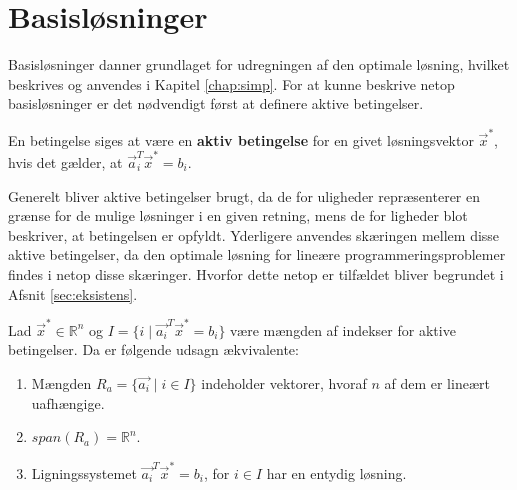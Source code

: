 \section{Basisløsninger}


Basisløsninger danner grundlaget for udregningen af den optimale løsning, hvilket beskrives og anvendes i Kapitel \ref{chap:simp}. For at kunne beskrive netop basisløsninger er det nødvendigt først at definere aktive betingelser.%

\begin{defn}
En betingelse siges at være en \textbf{aktiv betingelse} for en givet løsningsvektor $\vec{x}^*$, hvis det gælder, at $\vec{a}_i^T \vec{x}^* = b_i$.
\label{def:aktiv}
\end{defn}

Generelt bliver aktive betingelser brugt, da de for uligheder repræsenterer en grænse for de mulige løsninger i en given retning, mens de for ligheder blot beskriver, at betingelsen er opfyldt.
Yderligere anvendes skæringen mellem disse aktive betingelser, da den optimale løsning for lineære programmeringsproblemer findes i netop disse skæringer. Hvorfor dette netop er tilfældet bliver begrundet i Afsnit \ref{sec:eksistens}.

\begin{stn}
Lad $\vec{x}^* \in \mathds{R}^n$ og $I = \{i \mid \vec{a_i}^T \vec{x}^* = b_i\}$ være mængden af indekser for aktive betingelser. Da er følgende udsagn ækvivalente:
\begin{enumerate}[label=(\alph*)]
\item Mængden $R_a =\{\vec{a_i} \mid i\in I\}$ indeholder vektorer, hvoraf $n$ af dem er lineært uafhængige.
\item $span(R_a) = \mathds{R}^n$.
\item Ligningssystemet $\vec{a_i}^T \vec{x}^* = b_i$, for $i \in I$ har en entydig løsning.
\end{enumerate}
\label{stn:uniklosning}
\end{stn} %

